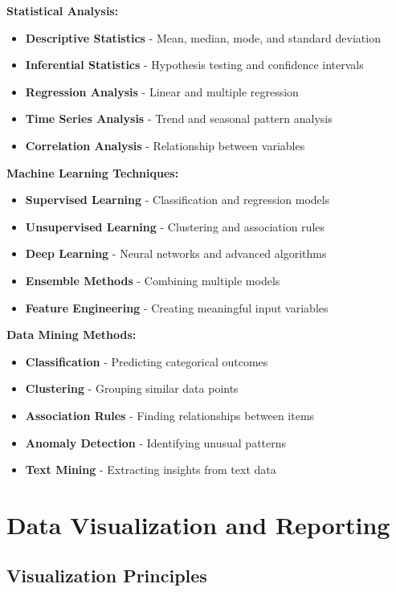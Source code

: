 \documentclass[12pt]{article}
\begin{document}
\textbf{Statistical Analysis:}
\begin{itemize}
    \item \textbf{Descriptive Statistics} - Mean, median, mode, and standard deviation
    \item \textbf{Inferential Statistics} - Hypothesis testing and confidence intervals
    \item \textbf{Regression Analysis} - Linear and multiple regression
    \item \textbf{Time Series Analysis} - Trend and seasonal pattern analysis
    \item \textbf{Correlation Analysis} - Relationship between variables
\end{itemize}

\textbf{Machine Learning Techniques:}
\begin{itemize}
    \item \textbf{Supervised Learning} - Classification and regression models
    \item \textbf{Unsupervised Learning} - Clustering and association rules
    \item \textbf{Deep Learning} - Neural networks and advanced algorithms
    \item \textbf{Ensemble Methods} - Combining multiple models
    \item \textbf{Feature Engineering} - Creating meaningful input variables
\end{itemize}

\textbf{Data Mining Methods:}
\begin{itemize}
    \item \textbf{Classification} - Predicting categorical outcomes
    \item \textbf{Clustering} - Grouping similar data points
    \item \textbf{Association Rules} - Finding relationships between items
    \item \textbf{Anomaly Detection} - Identifying unusual patterns
    \item \textbf{Text Mining} - Extracting insights from text data
\end{itemize}

\section{Data Visualization and Reporting}

\subsection{Visualization Principles}
\end{document}
